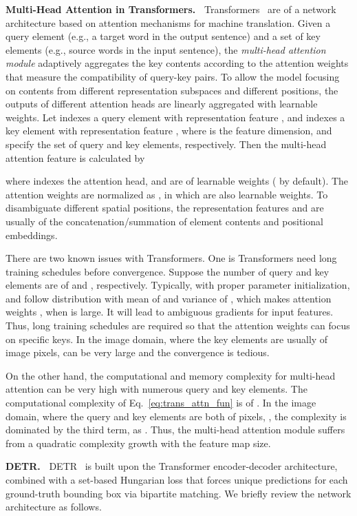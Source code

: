 \documentclass{article}
\begin{document}
\textbf{Multi-Head Attention in Transformers.~} Transformers~\citep{vaswani2017attention} are of a network architecture based on attention mechanisms for machine translation. Given a query element (e.g., a target word in the output sentence) and a set of key elements (e.g., source words in the input sentence), the \emph{multi-head attention module} adaptively aggregates the key contents according to the attention weights that measure the compatibility of query-key pairs. To allow the model focusing on contents from different representation subspaces and different positions, the outputs of different attention heads are linearly aggregated with learnable weights. Let  indexes a query element with representation feature , and  indexes a key element with representation feature , where  is the feature dimension,  and  specify the set of query and key elements, respectively. Then the multi-head attention feature is calculated by

where  indexes the attention head,  and  are of learnable weights ( by default). The attention weights  are normalized as , in which  are also learnable weights. To disambiguate different spatial positions, the representation features  and  are usually of the concatenation/summation of element contents and positional embeddings.


There are two known issues with Transformers. One is Transformers need long training schedules before convergence. Suppose the number of query and key elements are of  and , respectively.
Typically, with proper parameter initialization,  and  follow distribution with mean of  and variance of , which makes attention weights , when  is large.
It will lead to ambiguous gradients for input features. Thus, long training schedules are required so that the attention weights can focus on specific keys. In the image domain, where the key elements are usually of image pixels,  can be very large and the convergence is tedious.


On the other hand, the computational and memory complexity for multi-head attention can be very high with numerous query and key elements. The computational complexity of Eq.~\ref{eq:trans_attn_fun} is of . In the image domain, where the query and key elements are both of pixels, , the complexity is dominated by the third term, as . Thus, the multi-head attention module suffers from a quadratic complexity growth with the feature map size.

\textbf{DETR.~} DETR~\citep{carion2020end} is built upon the Transformer encoder-decoder architecture, combined with a set-based Hungarian loss that forces unique predictions for each ground-truth bounding box via bipartite matching. We briefly review the network architecture as follows.
\end{document}
